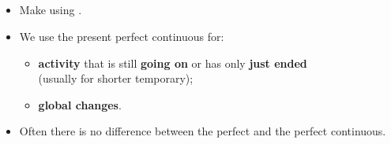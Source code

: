 \subsection{}
\begin{itemize}
    \item[\doot] Make using .
    \item[\doot] We use the present perfect continuous for:
    \begin{itemize}
        \item[\daash] \textbf{activity} that is still \textbf{going on} or has only \textbf{just ended}\\
        (usually for shorter temporary);
        \item[\daash] \textbf{global changes}.
    \end{itemize}
    \item[\aast] Often there is no difference between the perfect and the perfect continuous.
\end{itemize}